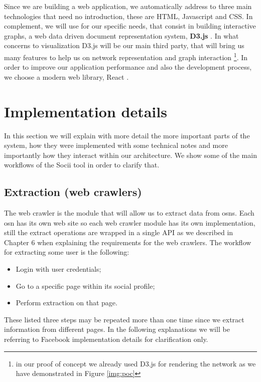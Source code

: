 Since we are building a web application, we automatically address to three main technologies that need no introduction, these are HTML, Javascript and CSS. In complement, we will use for our specific needs, that consist in building interactive graphs, a web data driven document representation system, \textbf{D3.js} \citep{bostock2012d3}. In what concerns to visualization D3.js will be our main third party, that will bring us many features to help us on network representation and graph interaction \footnote{in our proof of concept we already used D3.js for rendering the network as we have demonstrated in Figure \ref{img:poc}}.
In order to improve our application performance and also the development process, we choose a modern web library, React \citep{react}.

\section{Implementation details}

In this section we will explain with more detail the more important parts of the system, how they were implemented with some technical notes and more importantly how they interact within our architecture. We show some of the main workflows of the Socii tool in order to clarify that.

\subsection{Extraction (web crawlers)}
The web crawler is the module that will allow us to extract data from \glspl{osn}. Each \gls{osn} has its own web site so each web crawler module has its own implementation, still the extract operations are wrapped in a single API as we described in Chapter 6 when explaining the requirements for the web crawlers. The workflow for extracting some user is the following:
\begin{itemize}
    \item Login with user credentials;
    \item Go to a specific page within its social profile;
    \item Perform extraction on that page.
\end{itemize}
These listed three steps may be repeated more than one time since we extract information from different pages. In the following explanations we will be referring to Facebook implementation details for clarification only.

